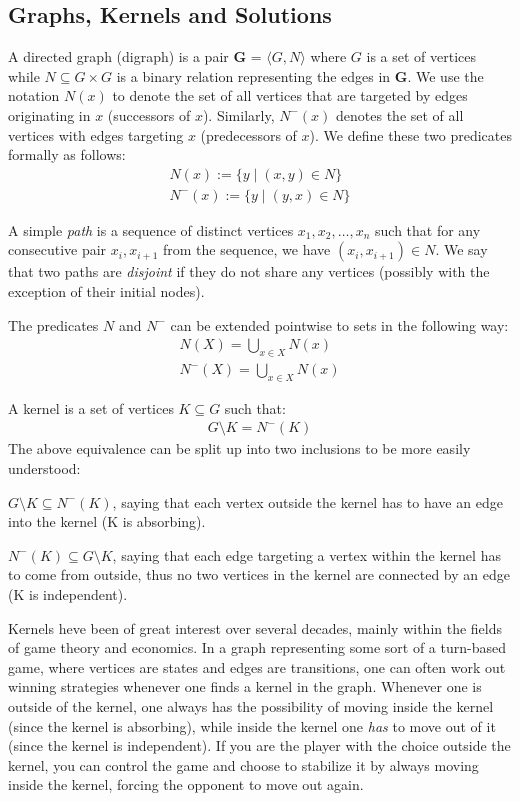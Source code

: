 \subsection{Graphs, Kernels and Solutions}
\label{sub:Graphs, Kernels and Solution}
A directed graph (digraph) is a pair \textbf{G} = $\langle G,N \rangle$ where $G$ is a set of vertices while $N \subseteq G \times G$ is a binary relation representing the edges in \textbf{G}.
We use the notation $N(x)$ to denote the set of all vertices that are targeted by edges originating in $x$ (successors of $x$).
Similarly, $N^-(x)$ denotes the set of all vertices with edges targeting $x$ (predecessors of $x$).
We define these two predicates formally as follows:
\begin{align}
  N(x) := \{y \;|\; (x,y) \in N\}\\
  N^-(x) := \{ y \;|\; (y,x) \in N \}
\end{align}

A simple \textit{path} is a sequence of distinct vertices $x_1,x_2,\dots,x_n$ such that for any consecutive pair $x_i,x_{i+1}$ from the sequence, we have $(x_i, x_{i+1}) \in N$.
We say that two paths are \textit{disjoint} if they do not share any vertices (possibly with the exception of their initial nodes).

The predicates $N$ and $N^-$ can be extended pointwise to sets in the following way:
\begin{align}
  N(X) = \bigcup_{x \in X} N(x)\\
  N^-(X) = \bigcup_{x \in X} N(x)
\end{align}

A kernel is a set of vertices $K \subseteq G$ such that:
\begin{align}
  G \setminus K = N^-(K)
\end{align}
The above equivalence can be split up into two inclusions to be more easily understood:

$G \setminus K \subseteq N^-(K)$, saying that each vertex outside the kernel has to have an edge into the kernel (K is absorbing).

$N^-(K) \subseteq G \setminus K$, saying that each edge targeting a vertex within the kernel has to come from outside, thus no two vertices in the kernel are connected by an edge (K is independent).

Kernels heve been of great interest over several decades, mainly within the fields of game theory and economics\cite{neumann}.
In a graph representing some sort of a turn-based game, where vertices are states and edges are transitions, one can often work out winning strategies whenever one finds a kernel in the graph.
Whenever one is outside of the kernel, one always has the possibility of moving inside the kernel (since the kernel is absorbing), while inside the kernel one \textit{has} to move out of it (since the kernel is independent).
If you are the player with the choice outside the kernel, you can control the game and choose to stabilize it by always moving inside the kernel, forcing the opponent to move out again.

